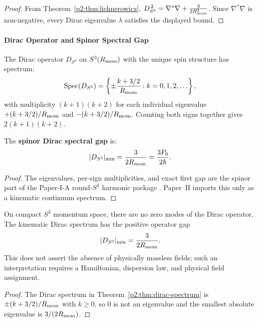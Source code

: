\documentclass[12pt,a4paper]{article}
\begin{document}
\begin{proof}
From Theorem~\ref{p2:thm:lichnerowicz}, $D_{S^3}^{\,2}=\nabla^*\nabla+\frac{3}{2R_{\mathrm{mom}}^2}$.
Since $\nabla^*\nabla$ is non-negative, every Dirac eigenvalue $\lambda$ satisfies the displayed bound.
\end{proof}


\paragraph{Dirac Operator and Spinor Spectral Gap}

\begin{theorem}
\label{p2:thm:dirac-spectrum}
The Dirac operator $D_{S^3}$ on $S^3(R_{\mathrm{mom}})$ with the unique spin structure has spectrum:
\begin{equation}
\mathrm{Spec}(D_{S^3}) = \left\{ \pm\frac{k + 3/2}{R_{\mathrm{mom}}} : k = 0, 1, 2, \ldots \right\},
\end{equation}
with multiplicity $(k+1)(k+2)$ for each individual eigenvalue $+(k+3/2)/R_{\mathrm{mom}}$ and $-(k+3/2)/R_{\mathrm{mom}}$. Counting both signs together gives $2(k+1)(k+2)$.

The \textbf{spinor Dirac spectral gap} is:
\begin{equation}
|{D_{S^3}}|_{\min} = \frac{3}{2R_{\mathrm{mom}}} = \frac{3P_{0}}{2\hbar}.
\end{equation}
\end{theorem}

\begin{proof}
The eigenvalues, per-sign multiplicities, and exact first gap are the spinor
part of the Paper-I-A round-\(S^3\) harmonic package
\cite{Kugelmann2026a}.  Paper~II imports this only as a kinematic continuum
spectrum.
\end{proof}

\begin{corollary}
\label{p2:cor:no-dirac-zero}
On compact \(S^3\) momentum space, there are no zero modes of the Dirac
operator.  The kinematic Dirac spectrum has the positive operator gap
\begin{equation}
|D_{S^3}|_{\min}=\frac{3}{2R_{\mathrm{mom}}}.
\end{equation}
This does not assert the absence of physically massless fields; such an
interpretation requires a Hamiltonian, dispersion law, and physical field
assignment.
\end{corollary}

\begin{proof}
The Dirac spectrum in Theorem~\ref{p2:thm:dirac-spectrum} is $\pm(k+3/2)/R_{\mathrm{mom}}$ with $k\ge 0$, so $0$ is not an eigenvalue and the smallest absolute eigenvalue is $3/(2R_{\mathrm{mom}})$.
\end{proof}
\end{document}

